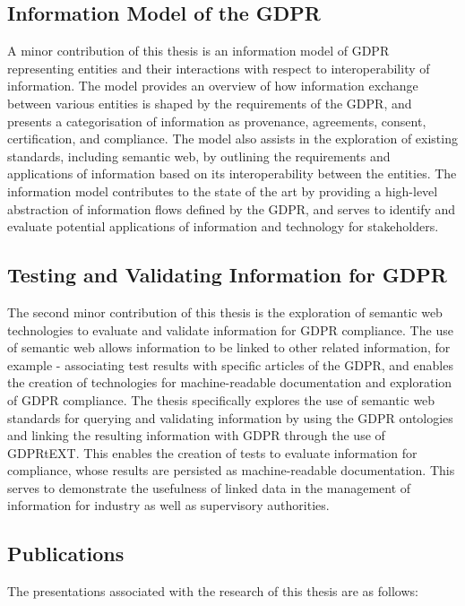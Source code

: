 \subsection{Information Model of the GDPR}
A minor contribution of this thesis is an information model of GDPR representing entities and their interactions with respect to interoperability of information. The model provides an overview of how information exchange between various entities is shaped by the requirements of the GDPR, and presents a categorisation of information as provenance, agreements, consent, certification, and compliance. The model also assists in the exploration of existing standards, including semantic web, by outlining the requirements and applications of information based on its interoperability between the entities. The information model contributes to the state of the art by providing a high-level abstraction of information flows defined by the GDPR, and serves to identify and evaluate potential applications of information and technology for stakeholders.

\subsection{Testing and Validating Information for GDPR}
The second minor contribution of this thesis is the exploration of semantic web technologies to evaluate and validate information for GDPR compliance. The use of semantic web allows information to be linked to other related information, for example - associating test results with specific articles of the GDPR, and enables the creation of technologies for machine-readable documentation and exploration of GDPR compliance. The thesis specifically explores the use of semantic web standards for querying and validating information by using the GDPR ontologies and linking the resulting information with GDPR through the use of GDPRtEXT. This enables the creation of tests to evaluate information for compliance, whose results are persisted as machine-readable documentation. This serves to demonstrate the usefulness of linked data in the management of information for industry as well as supervisory authorities.

\subsection{Publications}
The presentations associated with the research of this thesis are as follows:

